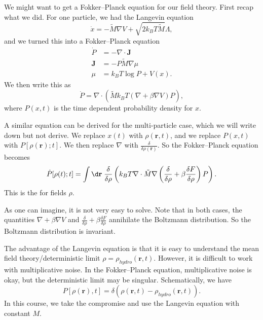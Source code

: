 \documentclass[a4paper]{article}
\begin{document}
We might want to get a Fokker--Planck equation for our field theory. First recap what we did. For one particle, we had the Langevin equation
\[
  \dot{x} = - \tilde{M} \nabla V + \sqrt{2k_B T \tilde{M}} \Lambda,
\]
and we turned this into a Fokker--Planck equation
\begin{align*}
  \dot{P} &= - \nabla \cdot \mathbf{J}\\
  \mathbf{J} &= -P \tilde{M} \nabla \mu\\
  \mu &= k_B T \log P + V(x).
\end{align*}
We then write this as
\[
  \dot{P} = \nabla \cdot \left(\tilde{M} k_B T \left(\nabla + \beta \nabla V\right)P\right),
\]
where $P(x, t)$ is the time dependent probability density for $x$.

A similar equation can be derived for the multi-particle case, which we will write down but not derive. We replace $x(t)$ with $\rho(\mathbf{r}, t)$, and we replace $P(x, t)$ with $P[\rho(\mathbf{r}); t]$. We then replace $\nabla$ with $\frac{\delta}{\delta \rho(\mathbf{r})}$. So the Fokker--Planck equation becomes
\[
  \dot{P}[\rho(t); t] = \int \d \mathbf{r} \; \frac{\delta}{\delta \rho} \left(k_B T \nabla \cdot \tilde{M} \nabla \left(\frac{\delta}{\delta \rho} + \beta \frac{\delta F}{\delta \rho}\right)P\right).
\]
This is the  for fields $\rho$.

As one can imagine, it is not very easy to solve. Note that in both cases, the quantities $\nabla + \beta \nabla V$ and $\frac{\delta}{\delta \rho} + \beta \frac{\delta F}{\delta \rho}$ annihilate the Boltzmann distribution. So the Boltzmann distribution is invariant.

The advantage of the Langevin equation is that it is easy to understand the mean field theory/deterministic limit $\rho = \rho_{hydro}(\mathbf{r}, t)$. However, it is difficult to work with multiplicative noise. In the Fokker--Planck equation, multiplicative noise is okay, but the deterministic limit may be singular. Schematically, we have
\[
  P[\rho(\mathbf{r}), t] = \delta(\rho(\mathbf{r}, t) - \rho_{hydro}(\mathbf{r}, t)).
\]
In this course, we take the compromise and use the Langevin equation with constant $M$.
\end{document}
